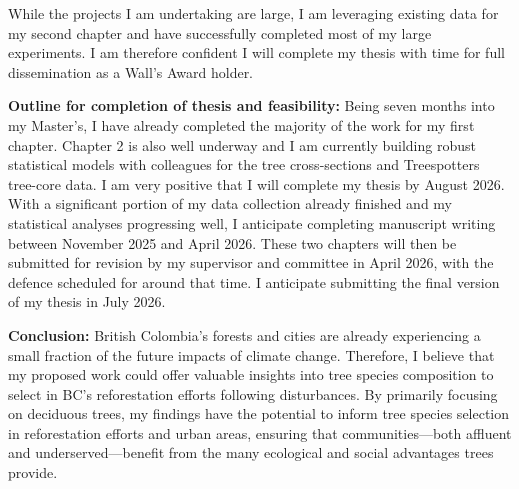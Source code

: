 \documentclass[11pt,letter]{article}
\begin{document}
While the projects I am undertaking are large, I am leveraging existing data for my second chapter and have successfully completed most of my large experiments. I am therefore confident I will complete my thesis with time for full dissemination as a Wall's Award holder. 
\par
\textbf{Outline for completion of thesis and feasibility:} Being seven months into my Master’s, I have already completed the majority of the work for my first chapter. Chapter 2 is also well underway and I am currently building robust statistical models with colleagues for the tree cross-sections and Treespotters tree-core data. 
I am very positive that I will complete my thesis by August 2026. With a significant portion of my data collection already finished and my statistical analyses progressing well, I anticipate completing manuscript writing between November 2025 and April 2026. These two chapters will then be submitted for revision by my supervisor and committee in April 2026, with the defence scheduled for around that time. I anticipate submitting the final version of my thesis in July 2026.

\textbf{Conclusion:} British Colombia’s forests and cities are already experiencing a small fraction of the future impacts of climate change. Therefore, I believe that my proposed work could offer valuable insights into tree species composition to select in BC's reforestation efforts following disturbances. By primarily focusing on deciduous trees, my findings have the potential to inform tree species selection in reforestation efforts and urban areas, ensuring that communities—both affluent and underserved—benefit from the many ecological and social advantages trees provide.

\end{document}
